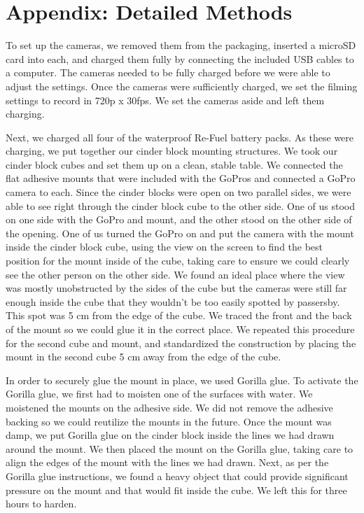 \documentclass{article}\usepackage[]{graphicx}\usepackage[]{color}
\begin{document}
\section{Appendix: Detailed Methods}

To set up the cameras, we removed them from the packaging, inserted a microSD card into each, and charged them fully by connecting the included USB cables to a computer. The cameras needed to be fully charged before we were able to adjust the settings. Once the cameras were sufficiently charged, we set the filming settings to record in 720p x 30fps. We set the cameras aside and left them charging. 

Next, we charged all four of the waterproof Re-Fuel battery packs. As these were charging, we put together our cinder block mounting structures. We took our cinder block cubes and set them up on a clean, stable table. We connected the flat adhesive mounts that were included with the GoPros and connected a GoPro camera to each. Since the cinder blocks were open on two parallel sides, we were able to see right through the cinder block cube to the other side. One of us stood on one side with the GoPro and mount, and the other stood on the other side of the opening. One of us turned the GoPro on and put the camera with the mount inside the cinder block cube, using the view on the screen to find the best position for the mount inside of the cube, taking care to ensure we could clearly see the other person on the other side. We found an ideal place where the view was mostly unobstructed by the sides of the cube but the cameras were still far enough inside the cube that they wouldn’t be too easily spotted by passersby. This spot was 5 cm from the edge of the cube. We traced the front and the back of the mount so we could glue it in the correct place. We repeated this procedure for the second cube and mount, and standardized the construction by placing the mount in the second cube 5 cm away from the edge of the cube. 

In order to securely glue the mount in place, we used Gorilla glue. To activate the Gorilla glue, we first had to moisten one of the surfaces with water. We moistened the mounts on the adhesive side. We did not remove the adhesive backing so we could reutilize the mounts in the future. Once the mount was damp, we put Gorilla glue on the cinder block inside the lines we had drawn around the mount. We then placed the mount on the Gorilla glue, taking care to align the edges of the mount with the lines we had drawn. Next, as per the Gorilla glue instructions, we found a heavy object that could provide significant pressure on the mount and that would fit inside the cube. We left this for three hours to harden.
\end{document}
